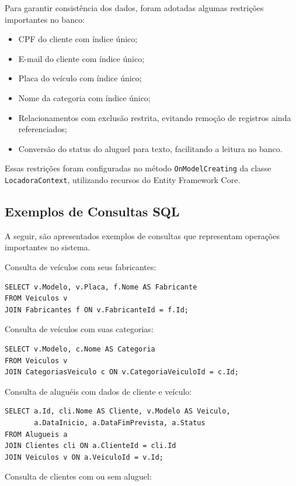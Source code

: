 \documentclass[12pt]{article}
\begin{document}
Para garantir consistência dos dados, foram adotadas algumas restrições importantes no banco:

\begin{itemize}
\item CPF do cliente com índice único;
\item E-mail do cliente com índice único;
\item Placa do veículo com índice único;
\item Nome da categoria com índice único;
\item Relacionamentos com exclusão restrita, evitando remoção de registros ainda referenciados;
\item Conversão do status do aluguel para texto, facilitando a leitura no banco.
\end{itemize}

Essas restrições foram configuradas no método \texttt{OnModelCreating} da classe \texttt{LocadoraContext}, utilizando recursos do Entity Framework Core.

\subsection{Exemplos de Consultas SQL}

A seguir, são apresentados exemplos de consultas que representam operações importantes no sistema.

Consulta de veículos com seus fabricantes:

\begin{verbatim}
SELECT v.Modelo, v.Placa, f.Nome AS Fabricante
FROM Veiculos v
JOIN Fabricantes f ON v.FabricanteId = f.Id;
\end{verbatim}

Consulta de veículos com suas categorias:

\begin{verbatim}
SELECT v.Modelo, c.Nome AS Categoria
FROM Veiculos v
JOIN CategoriasVeiculo c ON v.CategoriaVeiculoId = c.Id;
\end{verbatim}

Consulta de aluguéis com dados de cliente e veículo:

\begin{verbatim}
SELECT a.Id, cli.Nome AS Cliente, v.Modelo AS Veiculo,
       a.DataInicio, a.DataFimPrevista, a.Status
FROM Alugueis a
JOIN Clientes cli ON a.ClienteId = cli.Id
JOIN Veiculos v ON a.VeiculoId = v.Id;
\end{verbatim}

Consulta de clientes com ou sem aluguel:
\end{document}
